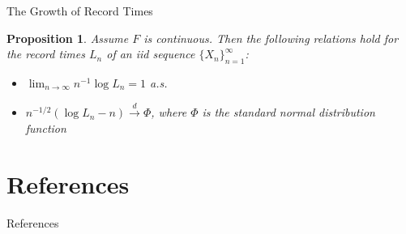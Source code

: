 \documentclass{beamer}
\newtheorem{proposition}{Proposition}
\begin{document}
\begin{frame}{The Growth of Record Times}
    \begin{proposition}
        Assume $F$ is continuous. Then the following relations hold for the record times $L_n$ of an iid sequence $\{X_n\}_{n = 1}^{\infty}$:
        \begin{itemize}
            \item $\lim_{n \to \infty} n^{-1}\log L_n = 1$ a.s.
            \item $n^{-1 / 2}(\log L_n - n) \xrightarrow{d} \Phi$, where $\Phi$ is the standard normal distribution function
        \end{itemize}
    \end{proposition}
\end{frame}

\section{References}

\begin{frame}[allowframebreaks]{References}
    \nocite{*}
    \printbibliography
\end{frame}
\end{document}
